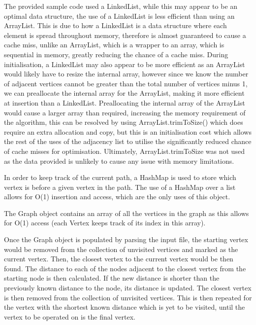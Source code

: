 \documentclass{article}
\begin{document}
    The provided sample code used a LinkedList, while this may appear to be an optimal data structure, the use of a 
    LinkedList is less efficient than using an ArrayList.
    This is due to how a LinkedList is a data structure where each element is spread throughout memory, therefore is 
    almost guaranteed to cause a cache miss, unlike an ArrayList, which is a wrapper to an array, which is sequential in
    memory, greatly reducing the chance of a cache miss.
    During initialisation, a LinkedList may also appear to be more efficient as an ArrayList would likely have to resize
    the internal array, however since we know the number of adjacent vertices cannot be greater than the total number of
    vertices minus 1, we can preallocate the internal array for the ArrayList, making it more efficient at insertion
    than a LinkedList.
    Preallocating the internal array of the ArrayList would cause a larger array than required,
    increasing the memory requirement of the algorithm, this can be resolved by using ArrayList.trimToSize() which does
    require an extra allocation and copy, but this is an initialisation cost which allows the rest of the uses of the
    adjacency list to utilise the significantly reduced chance of cache misses for optimisation.
    Ultimately, ArrayList.trimToSize was not used as the data provided is unlikely to cause any issue with memory
    limitations.

    In order to keep track of the current path, a HashMap is used to store which vertex is before a given
    vertex in the path.
    The use of a HashMap over a list allows for O(1) insertion and access, which are the only uses of this object.

    The Graph object contains an array of all the vertices in the graph as this allows for O(1) access (each Vertex keeps
    track of its index in this array).

    Once the Graph object is populated by parsing the input file, the starting vertex would be removed from the collection
    of unvisited vertices and marked as the current vertex.
    Then, the closest vertex to the current vertex would be then found.
    The distance to each of the nodes adjacent to the closest vertex from the starting node is then calculated.
    If the new distance is shorter than the previously known distance to the node, its distance is updated.
    The closest vertex is then removed from the collection of unvisited vertices.
    This is then repeated for the vertex with the shortest known distance which is yet to be visited, until the vertex to be
    operated on is the final vertex.
\end{document}
